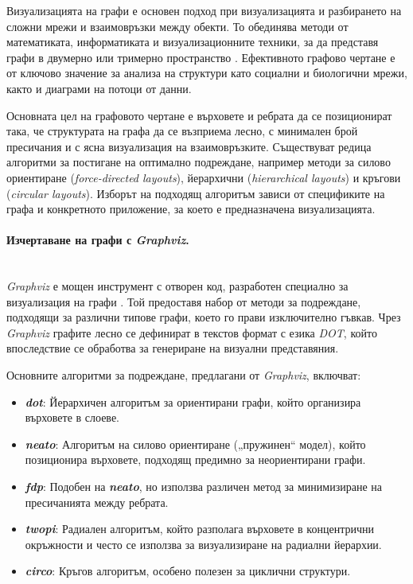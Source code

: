 \hspace*{2.5em}Визуализацията на графи е основен подход при визуализацията и разбирането на сложни мрежи и взаимовръзки между обекти. То обединява методи от математиката, информатиката и визуализационните техники, за да представя графи в двумерно или тримерно пространство \cite{Kamada1989}. Ефективното графово чертане е от ключово значение за анализа на структури като социални и биологични мрежи, както и диаграми на потоци от данни.

Основната цел на графовото чертане е върховете и ребрата да се позиционират така, че структурата на графа да се възприема лесно, с минимален брой пресичания и с ясна визуализация на взаимовръзките. Съществуват редица алгоритми за постигане на оптимално подреждане, например методи за силово ориентиране (\textit{force-directed layouts}), йерархични (\textit{hierarchical layouts}) и кръгови (\textit{circular layouts}). Изборът на подходящ алгоритъм зависи от спецификите на графа и конкретното приложение, за което е предназначена визуализацията.

\paragraph{Изчертаване на графи с \textit{Graphviz}.} 
\mbox{}\\
\textit{Graphviz} е мощен инструмент с отворен код, разработен специално за визуализация на графи \cite{Ellson2004}. Той предоставя набор от методи за подреждане, подходящи за различни типове графи, което го прави изключително гъвкав. Чрез \textit{Graphviz} графите лесно се дефинират в текстов формат с езика \textit{DOT}, който впоследствие се обработва за генериране на визуални представяния.

\vspace{0.2cm}

Основните алгоритми за подреждане, предлагани от \textit{Graphviz}, включват:

\vspace{-0.4cm}

\begin{itemize} 
	\item \textbf{\textit{dot}}: Йерархичен алгоритъм за ориентирани графи, който организира върховете в слоеве. 
	\item \textbf{\textit{neato}}: Алгоритъм на силово ориентиране („пружинен“ модел), който позиционира върховете, подходящ предимно за неориентирани графи. 
	\item \textbf{\textit{fdp}}: Подобен на \textbf{\textit{neato}}, но използва различен метод за минимизиране на пресичанията между ребрата. 
	\item \textbf{\textit{twopi}}: Радиален алгоритъм, който разполага върховете в концентрични окръжности и често се използва за визуализиране на радиални йерархии. 
	\item \textbf{\textit{circo}}: Кръгов алгоритъм, особено полезен за циклични структури. 
\end{itemize}

